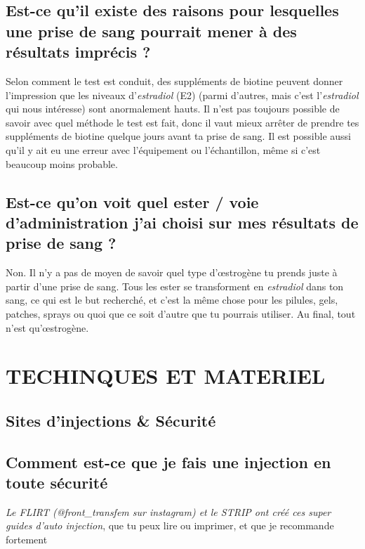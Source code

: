 \documentclass{article}
\begin{document}
\subsection{Est-ce qu'il existe des raisons pour lesquelles une prise de sang pourrait mener à des résultats imprécis ?}

Selon comment le test est conduit, des suppléments de biotine peuvent donner l'impression que les niveaux d'\textit{estradiol} (E2) (parmi d'autres, mais c'est l'\textit{estradiol} qui nous intéresse) sont anormalement hauts. Il n'est pas toujours possible de savoir avec quel méthode le test est fait, donc il vaut mieux arrêter de prendre tes suppléments de biotine quelque jours avant ta prise de sang. Il est possible aussi qu'il y ait eu une erreur avec l'équipement ou l'échantillon, même si c'est beaucoup moins probable.

\subsection{Est-ce qu'on voit quel ester / voie d'administration j'ai choisi sur mes résultats de prise de sang ?}\label{4-16}

Non. Il n'y a pas de moyen de savoir quel type d'œstrogène tu prends juste à partir d'une prise de sang. Tous les ester se transforment en \textit{estradiol} dans ton sang, ce qui est le but recherché, et c'est la même chose pour les pilules, gels, patches, sprays ou quoi que ce soit d'autre que tu pourrais utiliser. Au final, tout n'est qu'œstrogène. 
 

\section{TECHINQUES ET MATERIEL} \label{ts}

\subsection*{Sites d'injections \& Sécurité}

\subsection{Comment est-ce que je fais une injection en toute sécurité}

\textit{Le FLIRT (@front\_transfem sur instagram) et le STRIP ont créé ces super guides d'auto injection}, que tu peux lire ou imprimer, et que je recommande fortement
\end{document}
